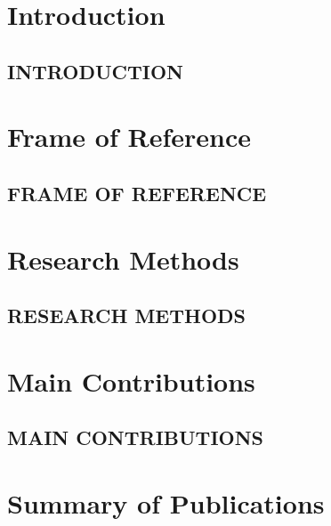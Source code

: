 \documentclass[english]{his-thesis}
\begin{document}
\part*{Introduction}
\label{part:introduction-method}
\mainmatter %

\chapter{INTRODUCTION}
\label{ch:introduction}
\lipsum[1]




\part*{Frame of Reference}
\label{part:frame-of-reference}

\chapter{FRAME OF REFERENCE}
\label{ch:baground}
\lipsum[1]




\part*{Research Methods}
\label{part:method}

\chapter{RESEARCH METHODS}
\label{ch:method}
\lipsum[1]




\part*{Main Contributions}
\label{part:contributions}

\chapter{MAIN CONTRIBUTIONS}
\label{ch:contributions}
\lipsum[1]




\part*{Summary of Publications}
\label{part:summary-publications}
\end{document}
